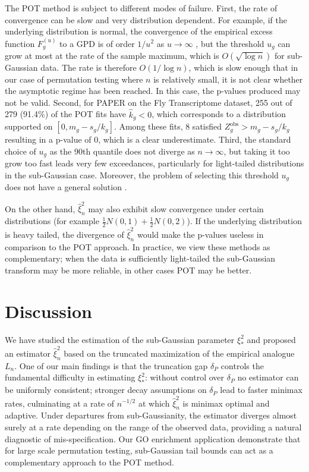 \documentclass{article}
\theoremstyle{definition}
\newcommand{\1}{\mathbbm{1}}
\begin{document}
The POT method is subject to different modes of failure. First, the rate of convergence can be slow and very distribution dependent. For example, if the underlying distribution is normal, the convergence of the empirical excess function $F^{(u)}_g$ to a GPD is of order $1/u^2$ as $u \to \infty$ \citep{Degen_Embrechts_Lambrigger_2007}, but the threshold $u_g$ can grow at most at the rate of the sample maximum, which is $O(\sqrt{\log n})$ for sub-Gaussian data. The rate is therefore $O(1/\log n)$, which is slow enough that in our case of permutation testing where $n$ is relatively small, it is not clear whether the asymptotic regime has been reached. In this case, the p-values produced may not be valid. Second, for PAPER on the Fly Transcriptome dataset, 255 out of 279 (91.4\%) of the POT fits have $\hat k_g < 0$, which corresponds to a distribution supported on $[0, m_g - s_g/k_g]$. Among these fits, 8 satisfied $Z_g^{\text{obs}} > m_g - s_g/k_g$ resulting in a p-value of 0, which is a clear underestimate. Third, the standard choice of $u_g$ as the 90th quantile does not diverge as $n \to \infty$, but taking it too grow too fast leads very few exceedances, particularly for light-tailed distributions in the sub-Gaussian case. Moreover, the problem of selecting this threshold $u_g$ does not have a general solution \citep{Degen_Embrechts_Lambrigger_2007}.


On the other hand, $\hat \xi_n^2$ may also exhibit slow convergence under certain distributions (for example $\frac12 N(0, 1) + \frac12 N(0, 2)$). If the underlying distribution is heavy tailed, the divergence of $\hat \xi_n^2$ would make the p-values useless in comparison to the POT approach. In practice, we view these methods as complementary; when the data is sufficiently light-tailed the sub-Gaussian transform may be more reliable, in other cases POT may be better.

\section{Discussion}

\label{sec:discussion}
We have studied the estimation of the sub-Gaussian parameter $\xi_*^2$ and proposed an estimator $\hat \xi_n^2$ based on the truncated maximization of the empirical analogue $L_n$. One of our main findings is that the truncation gap $\delta_P$ controls the fundamental difficulty in estimating $\xi_*^2$: without control over $\delta_P$ no estimator can be uniformly consistent; stronger decay assumptions on $\delta_P$ lead to faster minimax rates, culminating at a rate of $n^{-1/2}$ at which $\hat \xi_n^2$ is minimax optimal and adaptive. Under departures from sub-Gaussianity, the estimator diverges almost surely at a rate depending on the range of the observed data, providing a natural diagnostic of mis-specification. Our GO enrichment application demonstrate that for large scale permutation testing, sub-Gaussian tail bounds can act as a complementary approach to the POT method.
\end{document}

